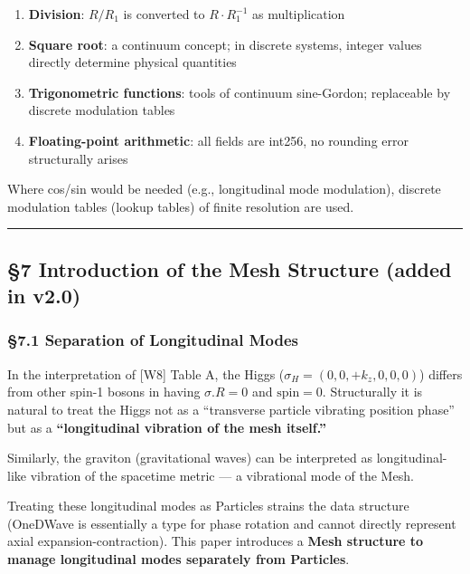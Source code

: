 \documentclass[a4paper,11pt]{article}
\providecommand{\tightlist}{\setlength{\itemsep}{0pt}\setlength{\parskip}{0pt}}
\begin{document}
\begin{enumerate}
\def\labelenumi{\arabic{enumi}.}
\tightlist
\item
  \textbf{Division}: \(R/R_1\) is converted to \(R \cdot R_1^{-1}\) as
  multiplication
\item
  \textbf{Square root}: a continuum concept; in discrete systems,
  integer values directly determine physical quantities
\item
  \textbf{Trigonometric functions}: tools of continuum sine-Gordon;
  replaceable by discrete modulation tables
\item
  \textbf{Floating-point arithmetic}: all fields are int256, no rounding
  error structurally arises
\end{enumerate}

Where cos/sin would be needed (e.g., longitudinal mode modulation),
discrete modulation tables (lookup tables) of finite resolution are
used.

\begin{center}\rule{0.5\linewidth}{0.5pt}\end{center}

\subsection{§7 Introduction of the Mesh Structure (added in
v2.0)}\label{introduction-of-the-mesh-structure-added-in-v2.0}

\subsubsection{§7.1 Separation of Longitudinal
Modes}\label{separation-of-longitudinal-modes}

In the interpretation of {[}W8{]} Table A, the Higgs
(\(\sigma_H = (0, 0, +k_z, 0, 0, 0)\)) differs from other spin-1 bosons
in having \(\sigma.R = 0\) and \(\text{spin} = 0\). Structurally it is
natural to treat the Higgs not as a ``transverse particle vibrating
position phase'' but as a \textbf{``longitudinal vibration of the mesh
itself.''}

Similarly, the graviton (gravitational waves) can be interpreted as
longitudinal-like vibration of the spacetime metric --- a vibrational
mode of the Mesh.

Treating these longitudinal modes as Particles strains the data
structure (OneDWave is essentially a type for phase rotation and cannot
directly represent axial expansion-contraction). This paper introduces a
\textbf{Mesh structure to manage longitudinal modes separately from
Particles}.
\end{document}
